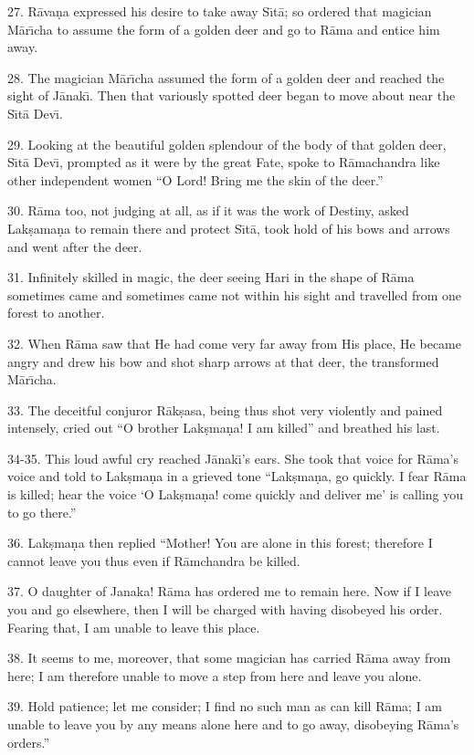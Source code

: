 27. R\=ava\d{n}a expressed his desire to take away S\={\i}t\=a; so ordered that magician M\=ar\={\i}cha to assume the form of a golden deer and go to R\=ama and entice him away.

28. The magician M\=ar\={\i}cha assumed the form of a golden deer and reached the sight of J\=anak\={\i}. Then that variously spotted deer began to move about near the S\={\i}t\=a Dev\={\i}.

29. Looking at the beautiful golden splendour of the body of that golden deer, S\={\i}t\=a Dev\={\i}, prompted as it were by the great Fate, spoke to R\=amachandra like other independent women ``O Lord! Bring me the skin of the deer.''

30. R\=ama too, not judging at all, as if it was the work of Destiny, asked Lak\d{s}ama\d{n}a to remain there and protect S\={\i}t\=a, took hold of his bows and arrows and went after the deer.

31. Infinitely skilled in magic, the deer seeing Hari in the shape of R\=ama sometimes came and sometimes came not within his sight and travelled from one forest to another.

32. When R\=ama saw that He had come very far away from His place, He became angry and drew his bow and shot sharp arrows at that deer, the transformed M\=ar\={\i}cha.

33. The deceitful conjuror R\=ak\d{s}asa, being thus shot very violently and pained intensely, cried out ``O brother Lak\d{s}ma\d{n}a! I am killed'' and breathed his last.

34-35. This loud awful cry reached J\=anak\={\i}'s ears. She took that voice for R\=ama's voice and told to Lak\d{s}ma\d{n}a in a grieved tone ``Lak\d{s}ma\d{n}a, go quickly. I fear R\=ama is killed; hear the voice `O Lak\d{s}ma\d{n}a! come quickly and deliver me' is calling you to go there.''

36. Lak\d{s}ma\d{n}a then replied ``Mother! You are alone in this forest; therefore I cannot leave you thus even if R\=amchandra be killed.

37. O daughter of Janaka! R\=ama has ordered me to remain here. Now if I leave you and go elsewhere, then I will be charged with having disobeyed his order. Fearing that, I am unable to leave this place.

38. It seems to me, moreover, that some magician has carried R\=ama away from here; I am therefore unable to move a step from here and leave you alone.

39. Hold patience; let me consider; I find no such man as can kill R\=ama; I am unable to leave you by any means alone here and to go away, disobeying R\=ama's orders.''

